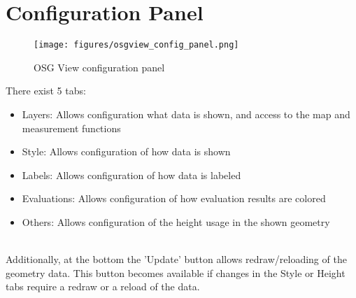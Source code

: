 \section{Configuration Panel}
\label{sec:osgview_config_panel}

\begin{figure}[H]
    \texttt{[image: figures/osgview\_config\_panel.png]}
  \caption{OSG View configuration panel}
\end{figure}

There exist 5 tabs:
\begin{itemize}
 \item Layers: Allows configuration what data is shown, and access to the map and measurement functions
 \item Style: Allows configuration of how data is shown
 \item Labels: Allows configuration of how data is labeled
 \item Evaluations: Allows configuration of how evaluation results are colored
 \item Others: Allows configuration of the height usage in the shown geometry
\end{itemize}
\ \\

Additionally, at the bottom the 'Update' button allows redraw/reloading of the geometry data. This button becomes available if changes in the Style or Height tabs require a redraw or a reload of the data. \\


 
 
 
